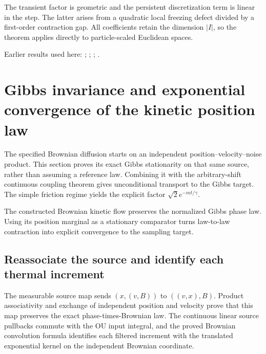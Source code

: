 \documentclass[11pt,a4paper]{report}
\begin{document}
The transient factor is geometric and the persistent discretization term is linear in the step. The latter arises from a quadratic local freezing defect divided by a first-order contraction gap. All coefficients retain the dimension \(|I|\), so the theorem applies directly to particle-scaled Euclidean spaces.



Earlier results used here: \cite[Section~3.17.3]{LangevinLean2026ULASC}; \cite[Section~3.17.4]{LangevinLean2026ULASC}; \cite[Section~3.26.15]{LangevinLean2026ULASC}; \cite[Section~3.26.3]{LangevinLean2026ULASC}.
\section{\texorpdfstring{Gibbs invariance and exponential convergence of the kinetic position law}{Gibbs invariance and exponential convergence of the kinetic position law}}
\label{proof-module-KineticLangevin-ContinuousGibbs-lean}


The specified Brownian diffusion starts on an independent position–velocity–noise product. This section proves its exact Gibbs stationarity on that same source, rather than assuming a reference law. Combining it with the arbitrary-shift continuous coupling theorem gives unconditional transport to the Gibbs target. The simple friction regime yields the explicit factor \(\sqrt{2}e^{-mt/\gamma}\).



The constructed Brownian kinetic flow preserves the normalized Gibbs phase law. Using its position marginal as a stationary comparator turns law-to-law contraction into explicit convergence to the sampling target.

\subsection{\texorpdfstring{Reassociate the source and identify each thermal increment}{Reassociate the source and identify each thermal increment}}
\label{report-step-KineticLangevin-ContinuousGibbs-lean-1}


The measurable source map sends \((x,(v,B))\) to \(((v,x),B)\). Product associativity and exchange of independent position and velocity prove that this map preserves the exact phase-times-Brownian law. The continuous linear source pullbacks commute with the OU input integral, and the proved Brownian convolution formula identifies each filtered increment with the translated exponential kernel on the independent Brownian coordinate.
\end{document}
